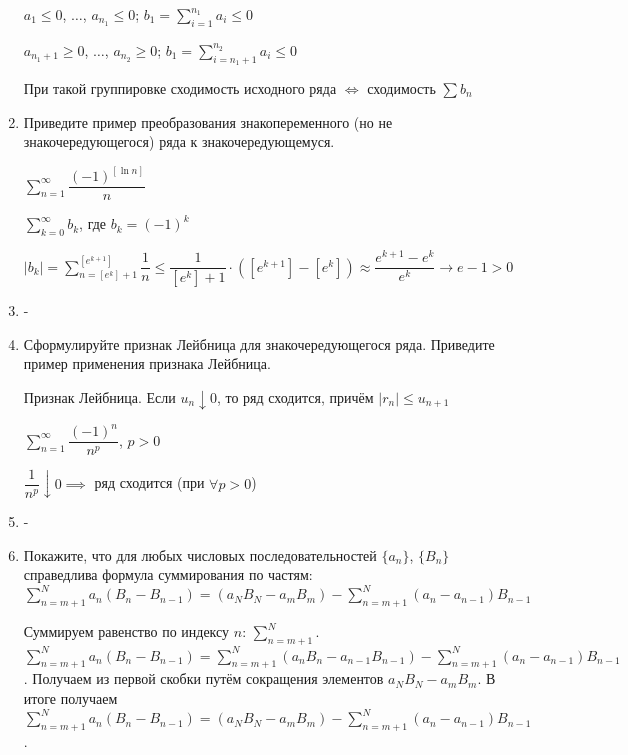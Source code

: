 \documentclass[a4paper]{article}
\begin{document}
\begin{enumerate}
        $a_1 \leq 0$, $\dots$, $a_{n_1} \leq 0$; $b_1 = \sum_{i=1}^{n_1} a_i \leq 0$

        $a_{n_1+1} \geq 0$, $\dots$, $a_{n_2} \geq 0$; $b_1 = \sum_{i={n_1 + 1}}^{n_2} a_i \leq 0$

        При такой группировке сходимость исходного ряда $\iff$ сходимость $\sum b_n$

        \item Приведите пример преобразования знакопеременного (но не знакочередующегося) ряда к знакочередующемуся.

        \begin{example}
            $\sum_{n=1}^{\infty} \dfrac{(-1)^{[\ln n]}}{n}$

            $\sum_{k=0}^{\infty} b_k$, где $b_k = (-1)^k$

            $|b_k| = \sum_{n=[e^k] + 1}^{[e^{k+1}]} \dfrac{1}{n} \leq \dfrac{1}{[e^k] + 1} \cdot ([e^{k+1}]-[e^k]) \approx \dfrac{e^{k+1} - e^k}{e^k} \to e - 1 > 0$
        \end{example}

        \item -
        \item Сформулируйте признак Лейбница для знакочередующегося ряда. Приведите пример применения признака Лейбница.
        
        \begin{theorem}
            Признак Лейбница. Если $u_n \downarrow 0$, то ряд сходится, причём $|r_n| \leq u_{n+1}$
            \end{theorem}
            
            \begin{example}
                $\sum_{n=1}^{\infty} \dfrac{(-1)^{n}}{n^p}$, $p > 0$
            
                $\dfrac{1}{n^p} \downarrow 0 \implies $ ряд сходится (при $\forall p > 0$)
            \end{example}

        \item -
        
        \item Покажите, что для любых числовых последовательностей $\{a_n\}$, $\{B_n\}$ справедлива формула суммирования по частям: $\sum_{n=m+1}^{N} a_n(B_n - B_{n-1}) = (a_NB_N-a_mB_m) - \sum_{n=m+1}^{N} (a_n - a_{n - 1}) B_{n-1}$
        
        Суммируем равенство по индексу $n$: $\sum_{n=m+1}^{N}$. $\sum_{n=m+1}^{N} a_n(B_n - B_{n-1}) = \sum_{n=m+1}^{N} (a_nB_n - a_{n-1}B_{n-1}) - \sum_{n=m+1}^{N} (a_n - a_{n-1})B_{n-1}$. Получаем из первой скобки путём сокращения элементов $a_N B_N - a_m B_m$. В итоге получаем $\sum_{n=m+1}^{N} a_n(B_n - B_{n-1}) = (a_NB_N-a_mB_m) - \sum_{n=m+1}^{N} (a_n - a_{n - 1}) B_{n-1}$.
        

\end{enumerate}
\end{document}
